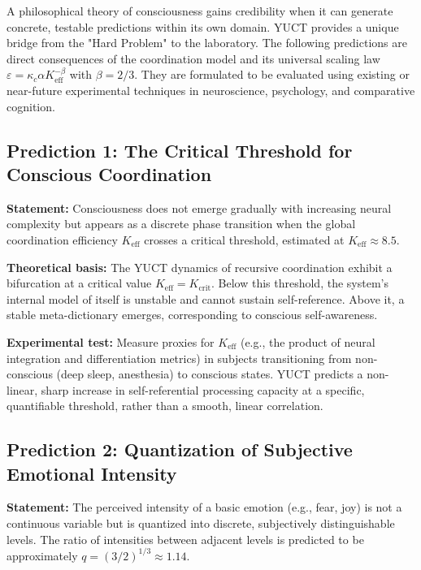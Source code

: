 \documentclass[12pt,a4paper]{article}
\begin{document}
	A philosophical theory of consciousness gains credibility when it can generate concrete, testable predictions within its own domain. YUCT provides a unique bridge from the "Hard Problem" to the laboratory. The following predictions are direct consequences of the coordination model and its universal scaling law \(\varepsilon = \kappa_c \alpha K_{\mathrm{eff}}^{-\beta}\) with \(\beta = 2/3\). They are formulated to be evaluated using existing or near-future experimental techniques in neuroscience, psychology, and comparative cognition.
	
	\subsection{Prediction 1: The Critical Threshold for Conscious Coordination}
	
	\textbf{Statement:} Consciousness does not emerge gradually with increasing neural complexity but appears as a discrete phase transition when the global coordination efficiency \(K_{\mathrm{eff}}\) crosses a critical threshold, estimated at \(K_{\mathrm{eff}} \approx 8.5\).
	
	\textbf{Theoretical basis:} The YUCT dynamics of recursive coordination exhibit a bifurcation at a critical value \(K_{\mathrm{eff}} = K_{\mathrm{crit}}\). Below this threshold, the system's internal model of itself is unstable and cannot sustain self-reference. Above it, a stable meta-dictionary emerges, corresponding to conscious self-awareness.
	
	\textbf{Experimental test:} Measure proxies for \(K_{\mathrm{eff}}\) (e.g., the product of neural integration and differentiation metrics) in subjects transitioning from non-conscious (deep sleep, anesthesia) to conscious states. YUCT predicts a non-linear, sharp increase in self-referential processing capacity at a specific, quantifiable threshold, rather than a smooth, linear correlation.
	
	\subsection{Prediction 2: Quantization of Subjective Emotional Intensity}
	
	\textbf{Statement:} The perceived intensity of a basic emotion (e.g., fear, joy) is not a continuous variable but is quantized into discrete, subjectively distinguishable levels. The ratio of intensities between adjacent levels is predicted to be approximately \(q = (3/2)^{1/3} \approx 1.14\).
	
\end{document}
